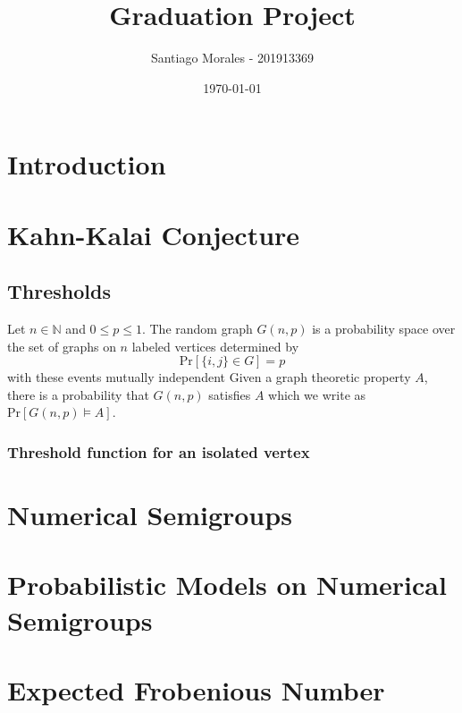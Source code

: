 \documentclass[12pt]{article}
\def\N{\ensuremath{\mathbb{N}}}
\begin{document}
\title{Graduation Project}
\author{Santiago Morales - 201913369}
\date{\today}

\maketitle
\section{Introduction}

\section{Kahn-Kalai Conjecture}
\subsection{Thresholds}
Let $n \in \N$ and $0 \leq p \leq 1$. The random graph $G(n, p)$ is a probability space over the set of graphs on $n$ labeled vertices determined by
\[\text{Pr}[\{i, j\} \in G] = p\] 
with these events mutually independent \cite{alon2016probabilistic} Given a graph theoretic property $A$, there is a probability that $G(n, p)$ satisfies $A$ which we write as $\text{Pr}[G(n, p) \vDash A]$.


\subsubsection{Threshold function for an isolated vertex}

\subsection{}
\section{Numerical Semigroups}

\section{Probabilistic Models on Numerical Semigroups}

\section{Expected Frobenious Number}



\end{document}
